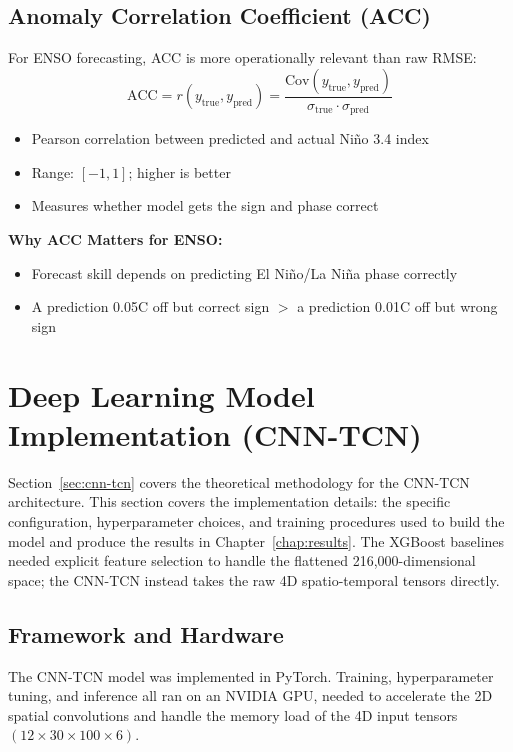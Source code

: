 \subsection{Anomaly Correlation Coefficient (ACC)}
For ENSO forecasting, ACC is more operationally relevant than raw RMSE:
\begin{equation}
\text{ACC} = r(y_{\text{true}}, y_{\text{pred}}) = \frac{\text{Cov}(y_{\text{true}}, y_{\text{pred}})}{\sigma_{\text{true}} \cdot \sigma_{\text{pred}}}
\end{equation}
\begin{itemize}
\item Pearson correlation between predicted and actual Ni\~{n}o 3.4 index
\item Range: $[-1, 1]$; higher is better
\item Measures whether model gets the sign and phase correct
\end{itemize}

\textbf{Why ACC Matters for ENSO:}
\begin{itemize}
\item Forecast skill depends on predicting El Ni\~{n}o/La Ni\~{n}a phase correctly
\item A prediction 0.05\degree C off but correct sign $>$ a prediction 0.01\degree C off but wrong sign
\end{itemize}

\section{Deep Learning Model Implementation (CNN-TCN)}
\label{sec:cnn-tcn-implementation}
Section~\ref{sec:cnn-tcn} covers the theoretical methodology for the CNN-TCN architecture. This section covers the implementation details: the specific configuration, hyperparameter choices, and training procedures used to build the model and produce the results in Chapter~\ref{chap:results}. The XGBoost baselines needed explicit feature selection to handle the flattened 216,000-dimensional space; the CNN-TCN instead takes the raw 4D spatio-temporal tensors directly.

\subsection{Framework and Hardware}
The CNN-TCN model was implemented in PyTorch. Training, hyperparameter tuning, and inference all ran on an NVIDIA GPU, needed to accelerate the 2D spatial convolutions and handle the memory load of the 4D input tensors $(12 \times 30 \times 100 \times 6)$.

